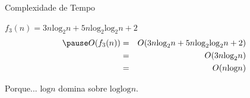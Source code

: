 \documentclass[xcolor=dvipsnames,table]{beamer}
\begin{document}
	\begin{frame}{Complexidade de Tempo}
		\begin{block}{$f_3 (n) =  3n \mbox{log}_2 n + 5n \mbox{log}_2 \mbox{log}_2 n + 2$}
			\begin{eqnarray} \pause
			O(f_3(n)) & = & O(3n \mbox{log}_2 n + 5n \mbox{log}_2 \mbox{log}_2 n + 2)\\
			& = & O(3n \mbox{log}_2 n)\\
			& = & O(n \mbox{log} n)
			\end{eqnarray}
		\end{block} \pause
		\begin{exampleblock}{Porque...}
			$\mbox{log} n$ domina sobre $\mbox{log} \mbox{log} n$.
		\end{exampleblock}
	\end{frame}
	
	\begin{frame}
		\titlepage
	\end{frame}
	
\end{document}
